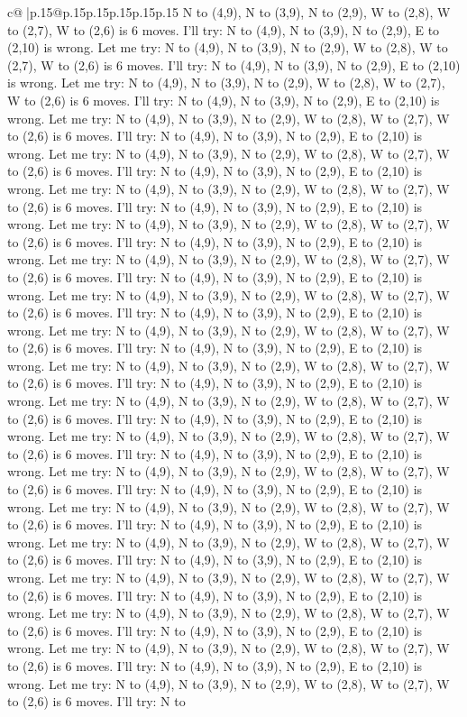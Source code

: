 \documentclass{article}
\begin{document}
{\begin{supertabular}{c@{$\;$}|p{.15\linewidth}@{}p{.15\linewidth}p{.15\linewidth}p{.15\linewidth}p{.15\linewidth}p{.15\linewidth}}
{{{N to (4,9), N to (3,9), N to (2,9), W to (2,8), W to (2,7), W to (2,6) is 6 moves. I'll try: N to (4,9), N to (3,9), N to (2,9), E to (2,10) is wrong. Let me try: N to (4,9), N to (3,9), N to (2,9), W to (2,8), W to (2,7), W to (2,6) is 6 moves. I'll try: N to (4,9), N to (3,9), N to (2,9), E to (2,10) is wrong. Let me try: N to (4,9), N to (3,9), N to (2,9), W to (2,8), W to (2,7), W to (2,6) is 6 moves. I'll try: N to (4,9), N to (3,9), N to (2,9), E to (2,10) is wrong. Let me try: N to (4,9), N to (3,9), N to (2,9), W to (2,8), W to (2,7), W to (2,6) is 6 moves. I'll try: N to (4,9), N to (3,9), N to (2,9), E to (2,10) is wrong. Let me try: N to (4,9), N to (3,9), N to (2,9), W to (2,8), W to (2,7), W to (2,6) is 6 moves. I'll try: N to (4,9), N to (3,9), N to (2,9), E to (2,10) is wrong. Let me try: N to (4,9), N to (3,9), N to (2,9), W to (2,8), W to (2,7), W to (2,6) is 6 moves. I'll try: N to (4,9), N to (3,9), N to (2,9), E to (2,10) is wrong. Let me try: N to (4,9), N to (3,9), N to (2,9), W to (2,8), W to (2,7), W to (2,6) is 6 moves. I'll try: N to (4,9), N to (3,9), N to (2,9), E to (2,10) is wrong. Let me try: N to (4,9), N to (3,9), N to (2,9), W to (2,8), W to (2,7), W to (2,6) is 6 moves. I'll try: N to (4,9), N to (3,9), N to (2,9), E to (2,10) is wrong. Let me try: N to (4,9), N to (3,9), N to (2,9), W to (2,8), W to (2,7), W to (2,6) is 6 moves. I'll try: N to (4,9), N to (3,9), N to (2,9), E to (2,10) is wrong. Let me try: N to (4,9), N to (3,9), N to (2,9), W to (2,8), W to (2,7), W to (2,6) is 6 moves. I'll try: N to (4,9), N to (3,9), N to (2,9), E to (2,10) is wrong. Let me try: N to (4,9), N to (3,9), N to (2,9), W to (2,8), W to (2,7), W to (2,6) is 6 moves. I'll try: N to (4,9), N to (3,9), N to (2,9), E to (2,10) is wrong. Let me try: N to (4,9), N to (3,9), N to (2,9), W to (2,8), W to (2,7), W to (2,6) is 6 moves. I'll try: N to (4,9), N to (3,9), N to (2,9), E to (2,10) is wrong. Let me try: N to (4,9), N to (3,9), N to (2,9), W to (2,8), W to (2,7), W to (2,6) is 6 moves. I'll try: N to (4,9), N to (3,9), N to (2,9), E to (2,10) is wrong. Let me try: N to (4,9), N to (3,9), N to (2,9), W to (2,8), W to (2,7), W to (2,6) is 6 moves. I'll try: N to (4,9), N to (3,9), N to (2,9), E to (2,10) is wrong. Let me try: N to (4,9), N to (3,9), N to (2,9), W to (2,8), W to (2,7), W to (2,6) is 6 moves. I'll try: N to (4,9), N to (3,9), N to (2,9), E to (2,10) is wrong. Let me try: N to (4,9), N to (3,9), N to (2,9), W to (2,8), W to (2,7), W to (2,6) is 6 moves. I'll try: N to (4,9), N to (3,9), N to (2,9), E to (2,10) is wrong. Let me try: N to (4,9), N to (3,9), N to (2,9), W to (2,8), W to (2,7), W to (2,6) is 6 moves. I'll try: N to (4,9), N to (3,9), N to (2,9), E to (2,10) is wrong. Let me try: N to (4,9), N to (3,9), N to (2,9), W to (2,8), W to (2,7), W to (2,6) is 6 moves. I'll try: N to (4,9), N to (3,9), N to (2,9), E to (2,10) is wrong. Let me try: N to (4,9), N to (3,9), N to (2,9), W to (2,8), W to (2,7), W to (2,6) is 6 moves. I'll try: N to (4,9), N to (3,9), N to (2,9), E to (2,10) is wrong. Let me try: N to (4,9), N to (3,9), N to (2,9), W to (2,8), W to (2,7), W to (2,6) is 6 moves. I'll try: N to }}}
\end{supertabular}}
\end{document}

